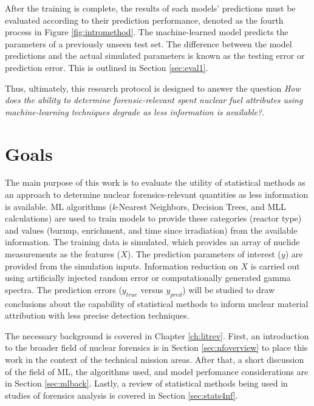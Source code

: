 After the training is complete, the results of each models' predictions must be
evaluated according to their prediction performance, denoted as the fourth
process in Figure \ref{fig:intromethod}.  The machine-learned model predicts
the parameters of a previously unseen test set.  The difference between the
model predictions and the actual simulated parameters is known as the testing
error or prediction error. This is outlined in Section \ref{sec:eval1}. 

Thus, ultimately, this research protocol is designed to answer the question
\textit{How does the ability to determine forensic-relevant spent nuclear fuel
attributes using machine-learning techniques degrade as less information is
available?}. 

\section{Goals}

The main purpose of this work is to evaluate the utility of statistical methods
as an approach to determine nuclear forensics-relevant quantities as less
information is available. \Gls{ML} algorithms (\textit{k}-Nearest Neighbors,
Decision Trees, and \gls{MLL} calculations) are used to train models to provide
these categories (reactor type) and values (burnup, enrichment, and time since
irradiation) from the available information.  The training data is simulated,
which provides an array of nuclide measurements as the features ($X$). The
prediction parameters of interest ($y$) are provided from the simulation
inputs. Information reduction on $X$ is carried out using artificially injected
random error or computationally generated gamma spectra. The prediction errors
($y_{true}$ versus $y_{pred}$) will be studied to draw conclusions about the
capability of statistical methods to inform nuclear material attribution with
less precise detection techniques.

The necessary background is covered in Chapter \ref{ch:litrev}.  First, an
introduction to the broader field of nuclear forensics is in Section
\ref{sec:nfoverview} to place this work in the context of the technical mission
areas. After that, a short discussion of the field of \gls{ML}, the algorithms
used, and model perfomance considerations are in Section \ref{sec:mlback}.
Lastly, a review of statistical methods being used in studies of forensics
analysis is covered in Section \ref{sec:stats4nf}. 

